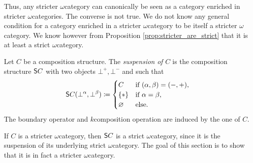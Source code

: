 \begin{comm}
    Thus, any stricter \( \omega \)\nbd category can canonically be seen as a category enriched in stricter \( \omega \)\nbd categories.
    The converse is not true. 
    We do not know any general condition for a category enriched in a stricter \( \omega \)\nbd category to be itself a stricter \( \omega \)\nbd category.
    We know however from Proposition \ref{prop:stricter_are_strict} that it is at least a strict \( \omega \)\nbd category.
\end{comm}

\begin{dfn} [Suspension]
    Let \( C \) be a composition structure.
    The \emph{suspension of \( C \)} is the composition structure \( \mathsf{S}{C} \) with two objects \( \bot^+, \bot^- \) and such that
    \begin{equation*}
        \mathsf{S}{C}(\bot^\alpha, \bot^\beta) \coloneqq 
        \begin{cases}
            C       & \text{if } (\alpha, \beta) = (-, +),\\
            \left\{ {*} \right\} & \text{if } \alpha = \beta,\\
            \varnothing & \text{else.}
        \end{cases}
    \end{equation*}
    The boundary operator and \( k \)\nbd composition operation are induced by the one of \( C \). 
\end{dfn}

\noindent If \( C \) is a stricter \( \omega \)\nbd category, then \( \mathsf{S}{C} \) is a strict \( \omega \)\nbd category, since it is the suspension of its underlying strict \( \omega \)\nbd category.
The goal of this section is to show that it is in fact a stricter \( \omega \)\nbd category. 

